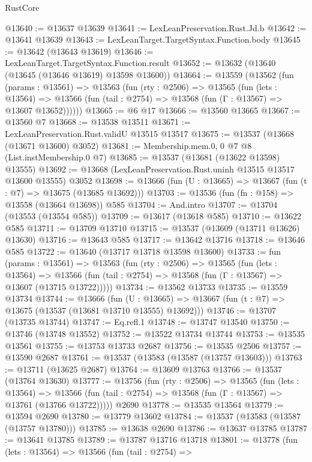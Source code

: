 \begin{lexlean}{RustCore}
\begin{coremodule}
@13640 := @13637 @13639
@13641 := LexLeanPreservation.Rust.Jd.b
@13642 := @13641 @13639
@13643 := LexLeanTarget.TargetSyntax.Function.body
@13645 := @13642 (@13643 @13619)
@13646 := LexLeanTarget.TargetSyntax.Function.result
@13652 := @13632 (@13640 (@13645 (@13646 @13619) @13598 @13600))
@13664 := @13559
    (@13562
      (fun (params : @13561) =>
      @13563
        (fun (rty : @2506) =>
        @13565
          (fun (lets : @13564) =>
          @13566 (fun (tail : @2754) => @13568 (fun (Γ : @13567) => @13607 @13652))))))
@13665 := @6 @17
@13666 := @13560 @13665
@13667 := @13560 @7
@13668 := @13538 @13511
@13671 := LexLeanPreservation.Rust.validU @13515 @13517
@13675 := @13537 (@13668 (@13671 @13600) @3052)
@13681 := Membership.mem.{0, 0} @7 @8 (List.instMembership.{0} @7)
@13685 := @13537 (@13681 (@13622 @13598) @13555)
@13692 := @13668 (LexLeanPreservation.Rust.uninh @13515 @13517 @13600 @13555) @3052
@13698 := @13666 (fun (U : @13665) => @13667 (fun (t : @7) => @13675 (@13685 @13692)))
@13703 := @13536 (fun (fn : @158) => @13558 (@13664 @13698)) @585
@13704 := And.intro
@13707 := @13704 (@13553 (@13554 @585))
@13709 := @13617 (@13618 @585)
@13710 := @13622 @585
@13711 := @13709 @13710
@13715 := @13537 (@13609 (@13711 @13626) @13630)
@13716 := @13643 @585
@13717 := @13642 @13716
@13718 := @13646 @585
@13722 := @13640 (@13717 @13718 @13598 @13600)
@13733 := fun (params : @13561) =>
  @13563
    (fun (rty : @2506) =>
    @13565
      (fun (lets : @13564) =>
      @13566 (fun (tail : @2754) => @13568 (fun (Γ : @13567) => @13607 (@13715 @13722)))))
@13734 := @13562 @13733
@13735 := @13559 @13734
@13744 := @13666
    (fun (U : @13665) => @13667 (fun (t : @7) => @13675 (@13537 (@13681 @13710 @13555) @13692)))
@13746 := @13707 (@13735 @13744)
@13747 := Eq.refl.{1}
@13748 := @13747 @13540
@13750 := @13746 (@13748 @13552)
@13752 := @13522 @13734 @13744
@13753 := @13535 @13561
@13755 := @13753 @13733 @2687
@13756 := @13535 @2506
@13757 := @13590 @2687
@13761 := @13537 (@13583 (@13587 (@13757 @13603)))
@13763 := @13711 (@13625 @2687)
@13764 := @13609 @13763
@13766 := @13537 (@13764 @13630)
@13777 := @13756
    (fun (rty : @2506) =>
    @13565
      (fun (lets : @13564) =>
      @13566 (fun (tail : @2754) => @13568 (fun (Γ : @13567) => @13761 (@13766 @13722)))))
    @2690
@13778 := @13535 @13564
@13779 := @13594 @2690
@13780 := @13779 @13602
@13784 := @13537 (@13583 (@13587 (@13757 @13780)))
@13785 := @13638 @2690
@13786 := @13637 @13785
@13787 := @13641 @13785
@13789 := @13787 @13716 @13718
@13801 := @13778
    (fun (lets : @13564) =>
    @13566
      (fun (tail : @2754) =>

\end{coremodule}
\end{lexlean}
